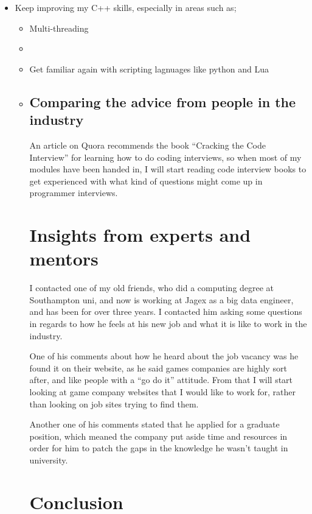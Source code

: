 \documentclass{scrartcl}
\begin{document}
\begin{itemize}
	\item Keep improving my C++ skills, especially in areas such as;
		\begin{itemize}
			\item Multi-threading
			\item 
	\item Get familiar again with scripting lagnuages like python and Lua
	\item 



\subsection{Comparing the advice from people in the industry}
An article on Quora \cite{codeBookreview} recommends the book ``Cracking the Code Interview'' for learning how to do coding interviews, so when most of my modules have been handed in, I will start reading code interview books to get experienced with what kind of questions might come up in programmer interviews.





\section{Insights from experts and mentors}

I contacted one of my old friends, who did a computing degree at Southampton uni, and now is working at Jagex as a big data engineer, and has been for over three years. 
I contacted him asking some questions in regards to how he feels at his new job and what it is like to work in the industry.

One of his comments about how he heard about the job vacancy was he found it on their website, as he said games companies are highly sort after, and like people with a ``go do it'' attitude.
From that I will start looking at game company websites that I would like to work for, rather than looking on job sites trying to find them.

Another one of his comments stated that he applied for a graduate position, which meaned the company put aside time and resources in order for him to patch the gaps in the knowledge he wasn't taught in university.



\section{Conclusion}





\end{itemize}
\end{itemize}
\end{document}
